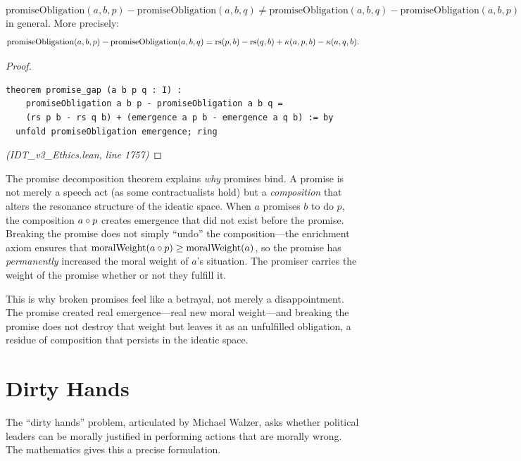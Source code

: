 \begin{theorem}
\label{thm:promise-non-commute}
\[
  \mathrm{promiseObligation}(a, b, p) - \mathrm{promiseObligation}(a, b, q)
  \neq \mathrm{promiseObligation}(a, b, q) - \mathrm{promiseObligation}(a, b, p)
\]
in general. More precisely:
\[
  \mathrm{promiseObligation}(a, b, p) - \mathrm{promiseObligation}(a, b, q)
  = \mathrm{rs}(p, b) - \mathrm{rs}(q, b) + \kappa(a, p, b) - \kappa(a, q, b).
\]
\end{theorem}

\begin{proof}
\begin{lstlisting}
theorem promise_gap (a b p q : I) :
    promiseObligation a b p - promiseObligation a b q =
    (rs p b - rs q b) + (emergence a p b - emergence a q b) := by
  unfold promiseObligation emergence; ring
\end{lstlisting}
\textit{(IDT\_v3\_Ethics.lean, line 1757)}
\end{proof}

\begin{interpretation}
The promise decomposition theorem explains \emph{why} promises bind.
A promise is not merely a speech act (as some contractualists hold) but
a \emph{composition} that alters the resonance structure of the ideatic
space. When $a$ promises $b$ to do $p$, the composition $a \circ p$
creates emergence that did not exist before the promise. Breaking the
promise does not simply ``undo'' the composition---the enrichment axiom
ensures that $\mathrm{moralWeight}(a \circ p) \geq \mathrm{moralWeight}(a)$,
so the promise has \emph{permanently} increased the moral weight of $a$'s
situation. The promiser carries the weight of the promise whether or not
they fulfill it.

This is why broken promises feel like a betrayal, not merely a
disappointment. The promise created real emergence---real new moral
weight---and breaking the promise does not destroy that weight but leaves
it as an unfulfilled obligation, a residue of composition that persists
in the ideatic space.
\end{interpretation}

\section{Dirty Hands}
\label{sec:dirty-hands}

The ``dirty hands'' problem, articulated by Michael Walzer, asks whether
political leaders can be morally justified in performing actions that are
morally wrong. The mathematics gives this a precise formulation.

